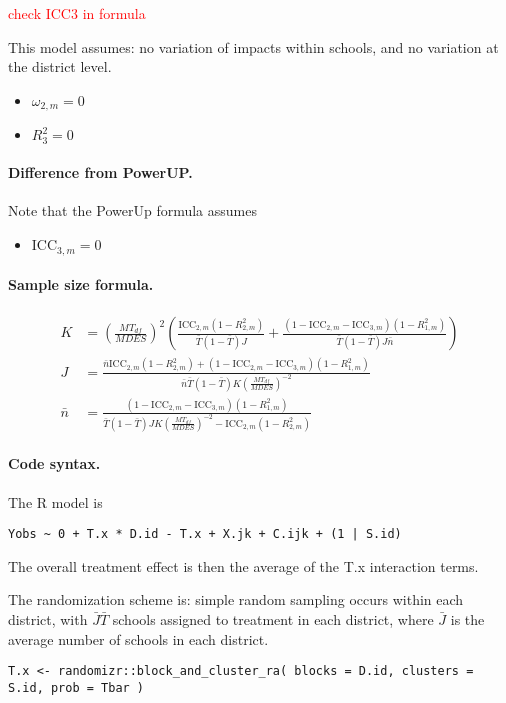 \documentclass[12pt]{article}
\begin{document}
\textcolor{red}{check ICC3 in formula}

This model assumes: no variation of impacts within schools, and no variation at the district level.
\begin{itemize}
\item $\omega_{2,m} = 0$
\item $R^2_3 = 0$
\end{itemize}

\paragraph{Difference from PowerUP.}

Note that the PowerUp formula assumes
\begin{itemize}
\item $\text{ICC}_{3,m} = 0$
\end{itemize}

\paragraph{Sample size formula.} 
\begin{align}
K &= \left(\frac{MT_{df}}{MDES}\right)^2 \left( \frac{\text{ICC}_{2,m} (1-R_{2,m}^2)}{\bar{T}(1 - \bar{T}) J} + \frac{(1-\text{ICC}_{2,m} - \text{ICC}_{3,m})(1-R^2_{1,m})}{\bar{T}(1 - \bar{T}) J \bar{n}} \right)\\
J &= \frac{\bar{n}\text{ICC}_{2,m} (1-R_{2,m}^2) + (1-\text{ICC}_{2,m} - \text{ICC}_{3,m})(1-R^2_{1,m})}{\bar{n} \bar{T}(1 - \bar{T}) K \left(\frac{MT_{df}}{MDES}\right)^{-2} } \\
\bar{n} &= \frac{(1-\text{ICC}_{2,m} - \text{ICC}_{3,m})(1-R^2_{1,m})}{\bar{T}(1 - \bar{T})J K \left(\frac{MT_{df}}{MDES}\right)^{-2} -  \text{ICC}_{2,m} (1-R_{2,m}^2)}
\end{align}


\paragraph{Code syntax.}
The R model is
\begin{verbatim}
Yobs ~ 0 + T.x * D.id - T.x + X.jk + C.ijk + (1 | S.id)
\end{verbatim}
The overall treatment effect is then the average of the T.x interaction terms.

The randomization scheme is: simple random sampling occurs within each district, with $\bar{J} \bar{T}$ schools assigned to treatment in each district, where $\bar{J}$ is the average number of schools in each district.
\begin{verbatim}
T.x <- randomizr::block_and_cluster_ra( blocks = D.id, clusters = S.id, prob = Tbar )
\end{verbatim}
\end{document}
